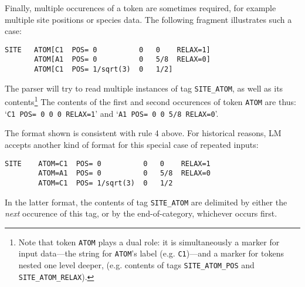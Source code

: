 \documentclass{article}
\begin{document}
\noindent
Finally, multiple occurences of a token are sometimes required, for example
multiple site positions or species data.  The following fragment
illustrates such a case:
\begin{verbatim}
SITE   ATOM[C1  POS= 0          0   0    RELAX=1]
       ATOM[A1  POS= 0          0   5/8  RELAX=0]
       ATOM[C1  POS= 1/sqrt(3)  0   1/2]
\end{verbatim}
The parser will try to read multiple instances of tag {\tt{}SITE\_ATOM}, as
well as its contents\footnote{ Note that token {\tt{}ATOM} plays a dual
role: it is simultaneously a marker for input data---the string for
{\tt{}ATOM}'s label (e.g. {\tt{}C1})---and a marker for tokens nested
one level deeper, (e.g. contents of tags {\tt{}SITE\_ATOM\_POS} and
{\tt{}SITE\_ATOM\_RELAX}).}  The contents of the first and second occurences
of token {\tt{}ATOM} are thus: \quad `{\tt{}C1 POS= 0 0 0 RELAX=1}'\quad
and \quad `{\tt{}A1 POS= 0 0 5/8 RELAX=0}'.

\vskip 6pt\noindent 
The format shown is consistent with rule 4 above.  For historical reasons,
LM accepts another kind of format for this special case of repeated inputs:
\begin{verbatim}
SITE    ATOM=C1  POS= 0          0   0    RELAX=1
        ATOM=A1  POS= 0          0   5/8  RELAX=0
        ATOM=C1  POS= 1/sqrt(3)  0   1/2
\end{verbatim}
In the latter format, the contents of tag {\tt{}SITE\_ATOM} are delimited
by either the \emph{next} occurence of this tag, or by the end-of-category,
whichever occurs first. 
\end{document}
